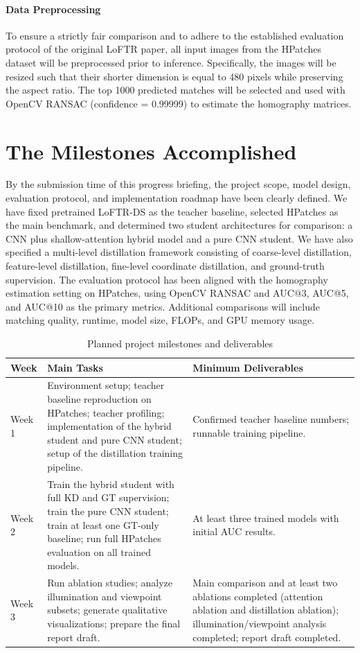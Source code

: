 \documentclass{article}
\begin{document}
\paragraph{Data Preprocessing}
To ensure a strictly fair comparison and to adhere to the established evaluation protocol of the original LoFTR paper, all input images from the HPatches dataset will be preprocessed prior to inference. Specifically, the images will be resized such that their shorter dimension is equal to 480 pixels while preserving the aspect ratio. The top 1000 predicted matches will be selected and used with OpenCV RANSAC (confidence = 0.99999) to estimate the homography matrices.



\section{The Milestones Accomplished}
By the submission time of this progress briefing, the project scope, model design, evaluation protocol, and implementation roadmap have been clearly defined. We have fixed pretrained LoFTR-DS as the teacher baseline, selected HPatches as the main benchmark, and determined two student architectures for comparison: a CNN plus shallow-attention hybrid model and a pure CNN student. We have also specified a multi-level distillation framework consisting of coarse-level distillation, feature-level distillation, fine-level coordinate distillation, and ground-truth supervision. The evaluation protocol has been aligned with the homography estimation setting on HPatches, using OpenCV RANSAC and AUC@3, AUC@5, and AUC@10 as the primary metrics. Additional comparisons will include matching quality, runtime, model size, FLOPs, and GPU memory usage.

\begin{table}[H]
\centering
\caption{Planned project milestones and deliverables}
\label{tab:milestones}
\renewcommand{\arraystretch}{1.2}
\begin{tabular}{|p{}|p{}|p{}|}
\hline
\textbf{Week} & \textbf{Main Tasks} & \textbf{Minimum Deliverables} \\
\hline
Week 1 &
Environment setup; teacher baseline reproduction on HPatches; teacher profiling; implementation of the hybrid student and pure CNN student; setup of the distillation training pipeline. &
Confirmed teacher baseline numbers; runnable training pipeline. \\
\hline
Week 2 &
Train the hybrid student with full KD and GT supervision; train the pure CNN student; train at least one GT-only baseline; run full HPatches evaluation on all trained models. &
At least three trained models with initial AUC results. \\
\hline
Week 3 &
Run ablation studies; analyze illumination and viewpoint subsets; generate qualitative visualizations; prepare the final report draft. &
Main comparison and at least two ablations completed (attention ablation and distillation ablation); illumination/viewpoint analysis completed; report draft completed. \\
\hline
\end{tabular}
\end{table}
\end{document}
